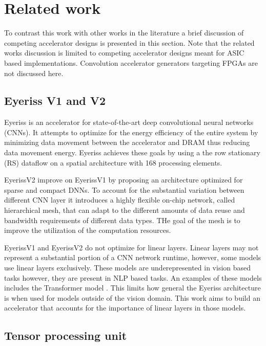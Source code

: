 \section{Related work}
\label{chap:related_work}

To contrast this work with other works in the literature a brief discussion of
competing accelerator designs is presented in this section. Note that the
related works discussion is limited to competing accelerator designs meant for
ASIC based implementations. Convolution accelerator generators targeting FPGAs
are not discussed here.

\subsection{Eyeriss V1 and V2}
\label{chap:related_work:eyeriss}

Eyeriss \cite{isscc_2016_chen_eyeriss} is an accelerator for state-of-the-art
deep convolutional neural networks (CNNs). It attempts to optimize for the
energy efficiency of the entire system by minimizing data movement between the
accelerator and DRAM thus reducing data movement energy. Eyeriss achieves these
goals by using a the row stationary (RS) dataflow on a spatial architecture with
168 processing elements. 

EyerissV2 \cite{eyerissv2} improve on EyerissV1 by proposing an architecture
optimized for sparse and compact DNNs. To account for the substantial variation
between different CNN layer it introduces a highly flexible on-chip network,
called hierarchical mesh, that can adapt to the different amounts of data reuse
and bandwidth requirements of different data types. THe goal of the mesh is to
improve the utilization of the computation resources.

EyerissV1 and EyerissV2 do not optimize for linear layers. Linear layers may not
represent a substantial portion of a CNN network runtime, however, some models
use linear layers exclusively. These models are underepresented in vision based
tasks however, they are present in NLP based tasks. An examples of these
models includes the Transformer model \cite{transformer_model}. This limits how general the
Eyeriss architecture is when used for models outside of the vision domain. This
work aims to build an accelerator that accounts for the importance of linear
layers in those models. 

\subsection{Tensor processing unit}
\label{chap:related_work:tpu}

